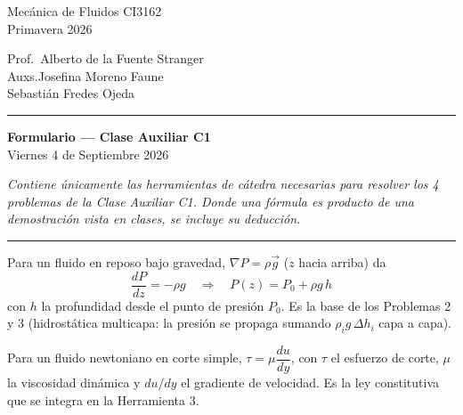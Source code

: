 \documentclass[12pt]{article}
\begin{document}
\shorthandoff{<>}
\large

\noindent
\begin{minipage}[t]{0.45\textwidth}
\raggedright
Mec\'anica de Fluidos CI3162\\
Primavera 2026
\end{minipage}%
\hfill
\begin{minipage}[t]{0.45\textwidth}
\raggedleft
Prof.\ Alberto de la Fuente Stranger\\
Auxs.\hspace{0.6cm}Josefina Moreno Faune\\
Sebasti\'an Fredes Ojeda
\end{minipage}

\vspace{3pt}
\hrule
\vspace{-5pt}

\begin{center}
{\Huge\bfseries Formulario --- Clase Auxiliar C1}\\[6pt]
Viernes 4 de Septiembre 2026
\end{center}

\vspace{14pt}

\noindent\textit{Contiene \'unicamente las herramientas de c\'atedra necesarias para
resolver los 4 problemas de la Clase Auxiliar C1. Donde una f\'ormula es producto de
una demostraci\'on vista en clases, se incluye su deducci\'on.}

\vspace{6pt}
\hrule
\vspace{10pt}


Para un fluido en reposo bajo gravedad, $\nabla P=\rho\vec g$ ($z$ hacia arriba) da
\[
\frac{dP}{dz}=-\rho g \quad\Longrightarrow\quad \boxed{P(z)=P_0+\rho g\,h}
\]
con $h$ la profundidad desde el punto de presi\'on $P_0$. Es la base de los Problemas
2 y 3 (hidrost\'atica multicapa: la presi\'on se propaga sumando $\rho_i g\,\Delta h_i$
capa a capa).


Para un fluido newtoniano en corte simple, $\tau=\mu\dfrac{du}{dy}$, con $\tau$ el
esfuerzo de corte, $\mu$ la viscosidad din\'amica y $du/dy$ el gradiente de velocidad.
Es la ley constitutiva que se integra en la Herramienta 3.
\end{document}
